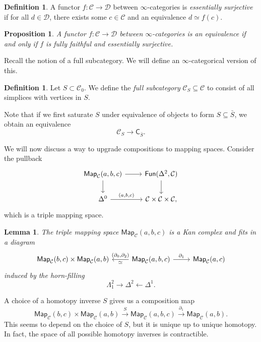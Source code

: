 \documentclass[10pt, oneside]{memoir}
\newtheorem{prop}[thm]{Proposition}
\newtheorem{lem}[thm]{Lemma}
\theoremstyle{definition}
\newtheorem{defn}[thm]{Definition}
\theoremstyle{remark}
\theoremstyle{plain}
\theoremstyle{definition}
\theoremstyle{remark}
\newcommand{\mc}[1]{\mathcal{#1}}
\newcommand{\ms}[1]{\mathsf{#1}}
\newcommand{\1}{\mathbf{1}}
\newcommand{\2}{\mathbf{2}}
\newcommand{\3}{\mathbf{3}}
\begin{document}
\begin{defn}
    A functor $f \colon \mc{C} \to \mc{D}$ between $\infty$-categories is \textit{essentially surjective} if for all $d \in \mc{D}$, there exists some $c \in \mc{C}$ and an equivalence $d \simeq f(c)$.
\end{defn}

\begin{prop}
    A functor $f \colon \mc{C} \to \mc{D}$ between $\infty$-categories is an equivalence if and only if $f$ is fully faithful and essentially surjective.
\end{prop}

Recall the notion of a full subcategory. We will define an $\infty$-categorical version of this.

\begin{defn}
    Let $S \subset \mc{C}_0$. We define the \textit{full subcategory} $\mc{C}_S \subseteq \mc{C}$ to consist of all simplices with vertices in $S$.
\end{defn}

Note that if we first saturate $S$ under equivalence of objects to form $S \subseteq \bar{S}$, we obtain an equivalence
\[ \mc{C}_S \to \ms{C}_{\bar{S}}. \]

We will now discuss a way to upgrade compositions to mapping spaces. Consider the pullback
\begin{equation*}
\begin{tikzcd}
    \ms{Map}_{\mc{C}}(a,b,c) \ar{r} \ar{d} & \ms{Fun}(\Delta^2, \mc{C}) \ar{d} \\
    \Delta^0 \ar{r}{(a,b,c)} & \mc{C} \times \mc{C} \times \mc{C},
\end{tikzcd}
\end{equation*}
which is a triple mapping space.

\begin{lem}
    The triple mapping space $\ms{Map}_{\mc{C}}(a,b,c)$ is a Kan complex and fits in a diagram
    \begin{equation*}
    \begin{tikzcd}
        \ms{Map}_{\mc{C}}(b,c) \times \ms{Map}_{\mc{C}}(a,b) & \ms{Map}_{\mc{C}}(a,b,c) \ar{l}[swap]{(\partial_0, \partial_2)}{\simeq} \ar{r}{\partial_1} & \ms{Map}_{\mc{C}}(a,c)
    \end{tikzcd}
    \end{equation*}
    induced by the horn-filling
    \[ \Lambda_1^2 \to \Delta^2 \gets \Delta^1. \]
\end{lem}

A choice of a homotopy inverse $S$ gives us a composition map
\[ \ms{Map}_{\mc{C}}(b,c) \times \ms{Map}_{\mc{C}}(a,b) \xrightarrow{S} \ms{Map}_{\mc{C}}(a,b,c) \xrightarrow{\partial_1} \ms{Map}_{\mc{C}}(a,b). \]
This seems to depend on the choice of $S$, but it is unique up to unique homotopy. In fact, the space of all possible homotopy inverses is contractible.
\end{document}
